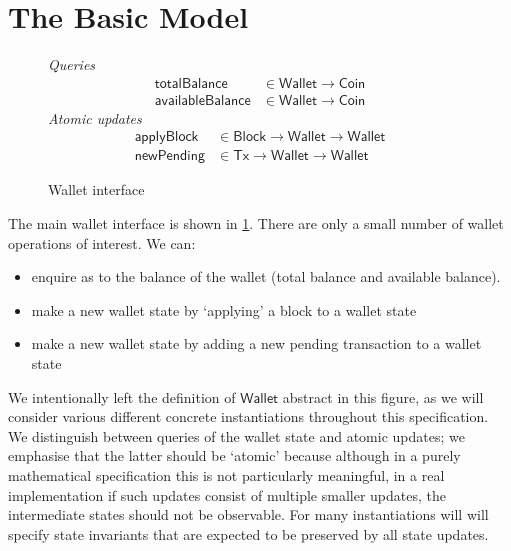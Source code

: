 \documentclass{article}
\theoremstyle{definition}{
  \newtheorem{lemma}{Lemma}[section] %
  \newtheorem{definition}[lemma]{Definition}
}
\theoremstyle{theorem}{
  \newtheorem{invariant}[lemma]{Invariant}
  \newtheorem{proofobligation}[lemma]{Proof Obligation}
}
\numberwithin{equation}{lemma}
\begin{document}
\section{The Basic Model}
\label{sec:wallet_operations}

\begin{figure}
%
\emph{Queries}
%
\begin{align*}
  \mathsf{totalBalance}
& \in \mathsf{Wallet} \to \mathsf{Coin}
\\
  \mathsf{availableBalance}
& \in \mathsf{Wallet} \to \mathsf{Coin}
\end{align*}
%
\emph{Atomic updates}
%
\begin{align*}
  \mathsf{applyBlock}
& \in \mathsf{Block} \to \mathsf{Wallet} \to \mathsf{Wallet}
\\
  \mathsf{newPending}
& \in \mathsf{Tx} \to \mathsf{Wallet} \to \mathsf{Wallet}
\end{align*}

\caption{\label{fig:wallet_interface}Wallet interface}
\end{figure}

The main wallet interface is shown in \cref{fig:wallet_interface}. There
are only a small number of wallet operations of interest. We can:
%
\begin{itemize}
\item enquire as to the balance of the wallet (total balance and
      available balance).
\item make a new wallet state by `applying' a block to a wallet state
\item make a new wallet state by adding a new pending transaction to a wallet
      state
\end{itemize}
%
We intentionally left the definition of $\mathsf{Wallet}$ abstract in this
figure, as we will consider various different concrete instantiations throughout
this specification. We distinguish between queries of the wallet state
and atomic updates; we emphasise that the latter should be `atomic' because
although in a purely mathematical specification this is not particularly
meaningful, in a real implementation if such updates consist of multiple
smaller updates, the intermediate states should not be observable. For many
instantiations will will specify state invariants that are expected to be
preserved by all state updates.
\end{document}
